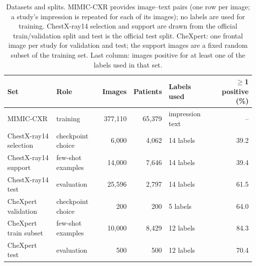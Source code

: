 \begin{table}[!t]
\centering
\footnotesize
\caption{Datasets and splits. MIMIC-CXR provides image--text pairs (one row per image; a study's impression is
repeated for each of its images); no labels are used for training. ChestX-ray14 selection and support are drawn from
the official train/validation split and test is the official test split. CheXpert: one frontal image per study for
validation and test; the support images are a fixed random subset of the training set. Last column: images
positive for at least one of the labels used in that set.}
\label{tab:data}
\begin{tabular}{llrrlr}
\toprule
Set & Role & Images & Patients & Labels used & $\geq$1 positive (\%) \\
\midrule
MIMIC-CXR & training & 377{,}110 & 65{,}379 & impression text & -- \\
ChestX-ray14 selection & checkpoint choice & 6{,}000 & 4{,}062 & 14 labels & 39.2 \\
ChestX-ray14 support & few-shot examples & 14{,}000 & 7{,}646 & 14 labels & 39.4 \\
ChestX-ray14 test & evaluation & 25{,}596 & 2{,}797 & 14 labels & 61.5 \\
CheXpert validation & checkpoint choice & 200 & 200 & 5 labels & 64.0 \\
CheXpert train subset & few-shot examples & 10{,}000 & 8{,}429 & 12 labels & 84.3 \\
CheXpert test & evaluation & 500 & 500 & 12 labels & 70.4 \\
\bottomrule
\end{tabular}
\end{table}
